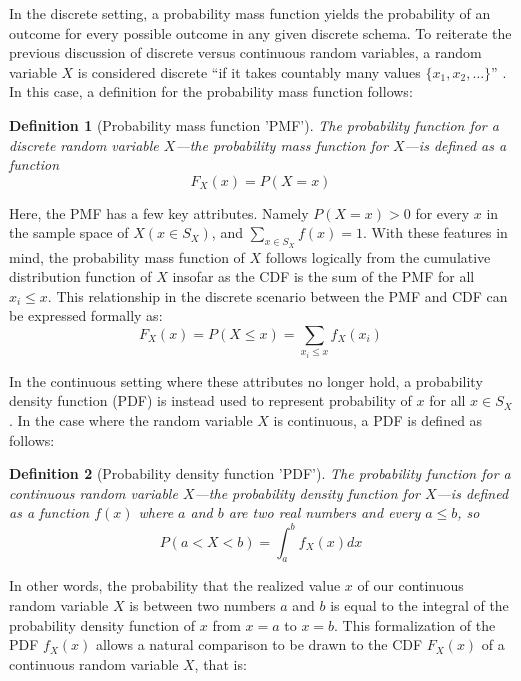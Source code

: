 \documentclass[
  12pt,
]{book}
\theoremstyle{definition}
\newtheorem{definition}{Definition}[chapter]
\theoremstyle{definition}
\theoremstyle{definition}
\theoremstyle{remark}
\begin{document}
In the discrete setting, a probability mass function yields the probability of an outcome for every possible outcome in any given discrete schema.
To reiterate the previous discussion of discrete versus continuous random variables, a random variable \(X\) is considered discrete ``if it takes countably many values \(\{x_{1}, x_{2}, …\}\)'' \citep{Wasserman2004}.
In this case, a definition for the probability mass function follows:

\begin{definition}[Probability mass function 'PMF']
\protect\hypertarget{def:pmf}{}{\label{def:pmf} {} }\emph{The probability function for a discrete random variable \(X\)---the probability mass function for \(X\)---is defined as a function}
\[F_{X}(x)=P(X=x)\]
\end{definition}

Here, the PMF has a few key attributes.
Namely \(P(X=x)>0\) for every \(x\) in the sample space of \(X (x \in S_{X})\), and \(\sum_{x \in S_{X}}f(x)=1\).
With these features in mind, the probability mass function of \(X\) follows logically from the cumulative distribution function of \(X\) insofar as the CDF is the sum of the PMF for all \(x_{i}≤x\).
This relationship in the discrete scenario between the PMF and CDF can be expressed formally as: \[F_{X}(x)=P(X≤x)=\sum_{x_i≤x}f_{X}(x_{i})\]

In the continuous setting where these attributes no longer hold, a probability density function (PDF) is instead used to represent probability of \(x\) for all \(x \in S_X\).
In the case where the random variable \(X\) is continuous, a PDF is defined as follows:

\begin{definition}[Probability density function 'PDF']
\protect\hypertarget{def:pdf}{}{\label{def:pdf} {} }\emph{The probability function for a continuous random variable \(X\)---the probability density function for \(X\)---is defined as a function \(f(x)\) where \(a\) and \(b\) are two real numbers and every \(a ≤ b\), so}
\[P(a<X<b)=\int_{a}^{b}f_X(x)dx\]
\end{definition}

In other words, the probability that the realized value \(x\) of our continuous random variable \(X\) is between two numbers \(a\) and \(b\) is equal to the integral of the probability density function of \(x\) from \(x = a\) to \(x = b\).
This formalization of the PDF \(f_X(x)\) allows a natural comparison to be drawn to the CDF \(F_X(x)\) of a continuous random variable \(X\), that is:
\end{document}

